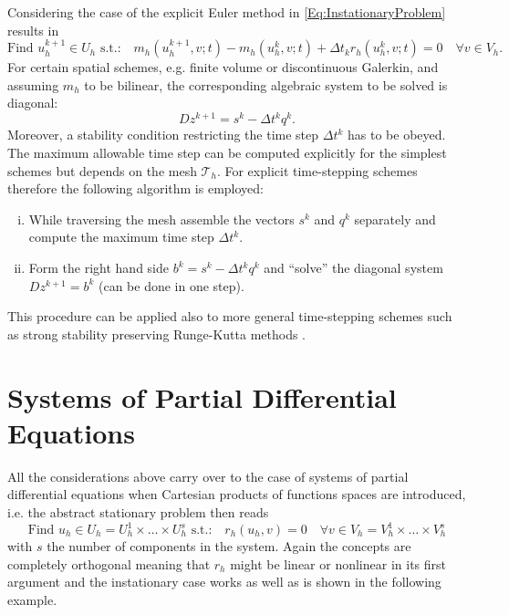 \documentclass[a4paper,12pt]{article}
\theoremstyle{definition}
\begin{document}
Considering the case of the explicit Euler method in \eqref{Eq:InstationaryProblem}
results in
\begin{equation*}
\text{Find $u_h^{k+1}\in U_h$ s.t.:}
\quad m_h(u_h^{k+1},v;t)-m_h(u_h^{k},v;t) +
\Delta t_k r_h(u_h^{k},v;t) = 0
\quad \forall v\in V_h.
\end{equation*}
For certain spatial schemes, e.g. finite volume or discontinuous Galerkin,
and assuming $m_h$ to be bilinear, the corresponding algebraic system
to be solved is diagonal:
\begin{equation}
Dz^{k+1} = s^k - \Delta t^k q^k.
\end{equation}
Moreover, a stability condition restricting the time step $\Delta t^k$
has to be obeyed. The maximum allowable time step can be computed
explicitly for the simplest schemes but depends on the mesh $\mathcal{T}_h$.
For explicit time-stepping schemes therefore the following algorithm is employed:
\begin{enumerate}[i)]
\item While traversing the mesh assemble the vectors $s^k$ and
$q^k$ separately and compute the maximum time step $\Delta t^k$.
\item Form the right hand side $b^k=s^k - \Delta t^k q^k$ and ``solve'' the
diagonal system $Dz^{k+1} = b^k$ (can be done in one step).
\end{enumerate}
This procedure can be applied also to more general time-stepping schemes
such as strong stability preserving Runge-Kutta methods \cite{shu:88}.

\section{Systems of Partial Differential Equations}

All the considerations above carry over to the case of systems of
partial differential equations when Cartesian products of
functions spaces are introduced, i.e. the abstract stationary problem then reads
\begin{equation}
\text{Find $u_h\in U_h=U_h^1\times \ldots \times U_h^s$ s.t.:} \quad r_h(u_h,v)=0
\quad \forall v\in V_h=V_h^1\times\ldots\times V_h^s
\label{Eq:BasicSystemBuildingBlock}
\end{equation}
with $s$ the number of components in the system. Again the concepts
are completely orthogonal meaning that $r_h$ might be linear or nonlinear
in its first argument and the instationary case works as well as is shown
in the following example.
\end{document}
